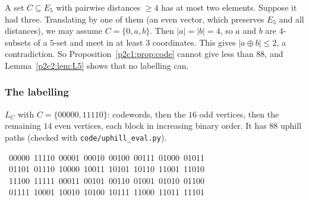 \begin{remark}
A set $C\subseteq E_5$ with pairwise distances $\ge4$ has at most two elements. Suppose it had three.
Translating by one of them (an even vector, which preserves $E_5$ and all distances), we may assume
$C=\{0,a,b\}$. Then $|a|=|b|=4$, so $a$ and $b$ are $4$-subsets of a $5$-set and meet in at least
$3$ coordinates. This gives $|a\oplus b|\le2$, a contradiction. So Proposition~\ref{p2c1:prop:code}
cannot give less than $88$, and Lemma~\ref{p2c2:lem:L5} shows that no labelling can.
\end{remark}

\subsubsection{The labelling}\label{p2c2:sec:lab}

$L_C$ with $C=\{00000,11110\}$: codewords, then the $16$ odd vertices, then the remaining $14$
even vertices, each block in increasing binary order. It has $88$ uphill paths (checked with
\texttt{code/uphill\_eval.py}).
\begin{flushleft}\small\ttfamily
{}\ 00000\ 11110\ 00001\ 00010\ 00100\ 00111\ 01000\ 01011\\
\ 01101\ 01110\ 10000\ 10011\ 10101\ 10110\ 11001\ 11010\\
\ 11100\ 11111\ 00011\ 00101\ 00110\ 01001\ 01010\ 01100\\
\ 01111\ 10001\ 10010\ 10100\ 10111\ 11000\ 11011\ 11101\\
\end{flushleft}
